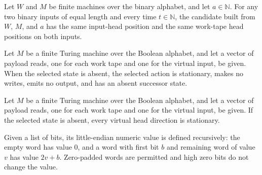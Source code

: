 \begin{lemma}
\label{Complexity.obliviousCandidate_oblivious}
\leanok
{}
Let $W$ and $M$ be finite machines over the binary alphabet, and let $a\in\mathbb{N}$.
For any two binary inputs of equal length and every time $t\in\mathbb{N}$, the candidate
built from $W$, $M$, and $a$ has the same input-head position and the same work-tape
head positions on both inputs.
\end{lemma}

\begin{lemma}
\label{Complexity.obliviousSourceAction_idle}
\leanok
{}
Let $M$ be a finite Turing machine over the Boolean alphabet, and let a vector of
payload reads, one for each work tape and one for the virtual input, be given. When the
selected state is absent, the selected action is stationary, makes no writes, emits no
output, and has an absent successor state.
\end{lemma}

\begin{lemma}
\label{Complexity.obliviousSourceMove_idle}
\leanok
{}
Let $M$ be a finite Turing machine over the Boolean alphabet, and let a vector of
payload reads, one for each work tape and one for the virtual input, be given. If the
selected state is absent, every virtual head direction is stationary.
\end{lemma}

\begin{definition}
\label{Complexity.budgetValue}
\leanok
Given a list of bits, its little-endian numeric value is defined recursively: the
empty word has value $0$, and a word with first bit $b$ and remaining word of value
$v$ has value $2v + b$.  Zero-padded words are permitted and high zero bits do not
change the value.
\end{definition}

